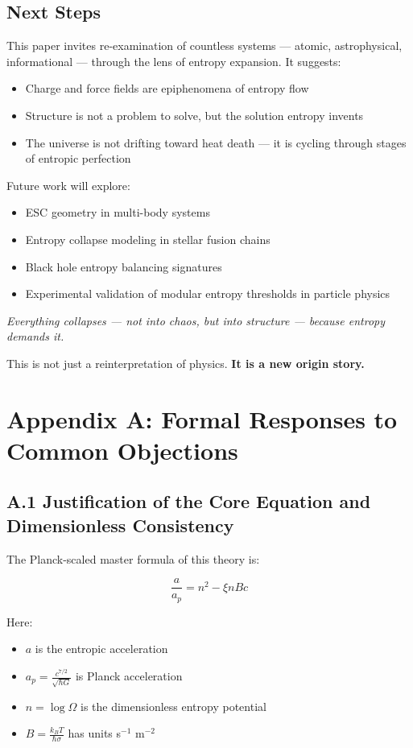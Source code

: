 \documentclass[12pt]{article}
\begin{document}
\subsection{Next Steps}

This paper invites re-examination of countless systems — atomic, astrophysical, informational — through the lens of entropy expansion. It suggests:
\begin{itemize}
    \item Charge and force fields are epiphenomena of entropy flow
    \item Structure is not a problem to solve, but the solution entropy invents
    \item The universe is not drifting toward heat death — it is cycling through stages of entropic perfection
\end{itemize}

Future work will explore:
\begin{itemize}
    \item ESC geometry in multi-body systems
    \item Entropy collapse modeling in stellar fusion chains
    \item Black hole entropy balancing signatures
    \item Experimental validation of modular entropy thresholds in particle physics
\end{itemize}

\bigskip
\noindent
\textit{Everything collapses — not into chaos, but into structure — because entropy demands it.}

\smallskip
\noindent
This is not just a reinterpretation of physics. \textbf{It is a new origin story.}

\appendix
\section*{Appendix A: Formal Responses to Common Objections}

\subsection*{A.1 Justification of the Core Equation and Dimensionless Consistency}

The Planck-scaled master formula of this theory is:

\[
\boxed{\frac{a}{a_p} = n^2 - \xi n B c}
\]

\noindent
Here:
\begin{itemize}
    \item \( a \) is the entropic acceleration
    \item \( a_p = \frac{c^{7/2}}{\sqrt{\hbar G}} \) is Planck acceleration
    \item \( n = \log \Omega \) is the dimensionless entropy potential
    \item \( B = \frac{k_B T}{\hbar \sigma} \) has units s\(^{-1}\) m\(^{-2}\)
\end{itemize}
\end{document}
